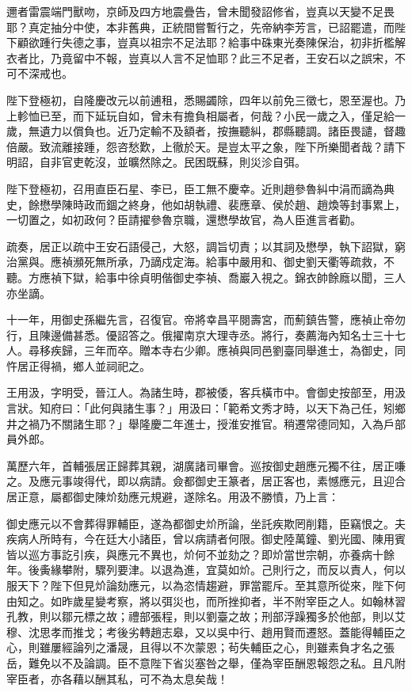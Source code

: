 \begin{pinyinscope}
邇者雷震端門獸吻，京師及四方地震疊告，曾未聞發詔修省，豈真以天變不足畏耶？真定抽分中使，本非舊典，正統間嘗暫行之，先帝納李芳言，已詔罷遣，而陛下顧欲踵行失德之事，豈真以祖宗不足法耶？給事中硃東光奏陳保治，初非折檻解衣者比，乃竟留中不報，豈真以人言不足恤耶？此三不足者，王安石以之誤宋，不可不深戒也。

陛下登極初，自隆慶改元以前逋租，悉賜蠲除，四年以前免三徵七，恩至渥也。乃上軫恤已至，而下延玩自如，曾未有擔負相屬者，何哉？小民一歲之入，僅足給一歲，無遺力以償負也。近乃定輸不及額者，按撫聽糾，郡縣聽調。諸臣畏譴，督趣倍嚴。致流離接踵，怨咨愁歎，上徹於天。是豈太平之象，陛下所樂聞者哉？請下明詔，自非官吏乾沒，並曠然除之。民困既蘇，則災沴自弭。

陛下登極初，召用直臣石星、李已，臣工無不慶幸。近則趙參魯糾中涓而謫為典史，餘懋學陳時政而錮之終身，他如胡執禮、裴應章、侯於趙、趙煥等封事累上，一切置之，如初政何？臣請擢參魯京職，還懋學故官，為人臣進言者勸。

疏奏，居正以疏中王安石語侵己，大怒，調旨切責；以其詞及懋學，執下詔獄，窮治黨與。應禎瀕死無所承，乃謫戍定海。給事中嚴用和、御史劉天衢等疏救，不聽。方應禎下獄，給事中徐貞明偕御史李禎、喬巖入視之。錦衣帥餘廕以聞，三人亦坐謫。

十一年，用御史孫繼先言，召復官。帝將幸昌平閱壽宮，而薊鎮告警，應禎止帝勿行，且陳邊備甚悉。優詔答之。俄擢南京大理寺丞。將行，奏薦海內知名士三十七人。尋移疾歸，三年而卒。贈本寺右少卿。應禎與同邑劉臺同舉進士，為御史，同忤居正得禍，鄉人並祠祀之。

王用汲，字明受，晉江人。為諸生時，郡被倭，客兵橫市中。會御史按部至，用汲言狀。知府曰：「此何與諸生事？」用汲曰：「範希文秀才時，以天下為己任，矧鄉井之禍乃不關諸生耶？」舉隆慶二年進士，授淮安推官。稍遷常德同知，入為戶部員外郎。

萬歷六年，首輔張居正歸葬其親，湖廣諸司畢會。巡按御史趙應元獨不往，居正嗛之。及應元事竣得代，即以病請。僉都御史王篆者，居正客也，素憾應元，且迎合居正意，屬都御史陳炌劾應元規避，遂除名。用汲不勝憤，乃上言：

御史應元以不會葬得罪輔臣，遂為都御史炌所論，坐託疾欺罔削籍，臣竊恨之。夫疾病人所時有，今在廷大小諸臣，曾以病請者何限。御史陸萬鐘、劉光國、陳用賓皆以巡方事訖引疾，與應元不異也，炌何不並劾之？即炌當世宗朝，亦養病十餘年。後夤緣攀附，驟列要津。以退為進，宜莫如炌。己則行之，而反以責人，何以服天下？陛下但見炌論劾應元，以為恣情趨避，罪當罷斥。至其意所從來，陛下何由知之。如昨歲星變考察，將以弭災也，而所挫抑者，半不附宰臣之人。如翰林習孔教，則以鄒元標之故；禮部張程，則以劉臺之故；刑部浮躁獨多於他部，則以艾穆、沈思孝而推戈；考後劣轉趙志皋，又以吳中行、趙用賢而遷怒。蓋能得輔臣之心，則雖屢經論列之潘晟，且得以不次蒙恩；茍失輔臣之心，則雖素負才名之張岳，難免以不及論調。臣不意陛下省災塞咎之舉，僅為宰臣酬恩報怨之私。且凡附宰臣者，亦各藉以酬其私，可不為太息矣哉！


\end{pinyinscope}
